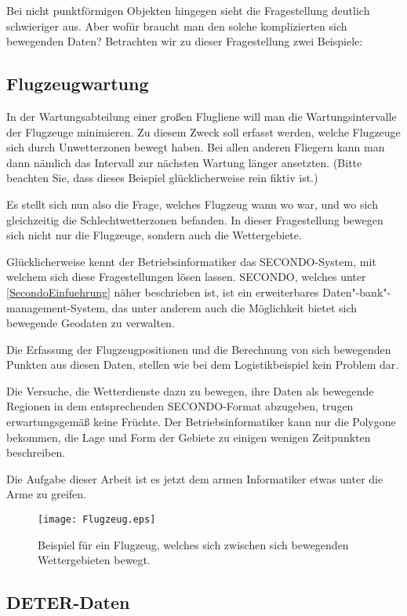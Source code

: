 Bei nicht punktförmigen Objekten hingegen sieht die Fragestellung deutlich schwieriger aus. Aber wofür braucht man den solche komplizierten sich bewegenden Daten? Betrachten wir zu dieser Fragestellung zwei Beispiele:

\subsection*{Flugzeugwartung}

In der Wartungsabteilung einer großen Flugliene will man die Wartungsintervalle der Flugzeuge minimieren. Zu diesem Zweck soll erfasst werden, welche Flugzeuge sich durch Unwetterzonen bewegt haben. Bei allen anderen Fliegern kann man dann nämlich das Intervall zur nächsten Wartung länger ansetzten. (Bitte beachten Sie, dass dieses Beispiel glücklicherweise rein fiktiv ist.)

Es stellt sich nun also die Frage, welches Flugzeug wann wo war, und wo sich gleichzeitig die Schlechtwetterzonen befanden. In dieser Fragestellung bewegen sich nicht nur die Flugzeuge, sondern auch die Wettergebiete.

Glücklicherweise kennt der Betriebsinformatiker das SECONDO-System, mit welchem sich diese Fragestellungen lösen lassen. SECONDO, welches unter \ref{SecondoEinfuehrung} näher beschrieben ist, ist ein erweiterbares Daten"-bank"-management-System, das unter anderem auch die Möglichkeit bietet sich bewegende Geodaten zu verwalten.

Die Erfassung der Flugzeugpositionen und die Berechnung von sich bewegenden Punkten aus diesen Daten, stellen wie bei dem Logistikbeispiel kein Problem dar.

Die Versuche, die Wetterdienste dazu zu bewegen, ihre Daten als bewegende Regionen in dem entsprechenden SECONDO-Format abzugeben, trugen erwartungsgemäß keine Früchte. Der Betriebsinformatiker kann nur die Polygone bekommen, die Lage und Form der Gebiete zu einigen wenigen Zeitpunkten beschreiben.

Die Aufgabe dieser Arbeit ist es jetzt dem armen Informatiker etwas unter die Arme zu greifen.

\begin{figure}
	\centering
	\texttt{[image: Flugzeug.eps]}
	\caption[Flugzeug zwischen Wettergebieten]{Beispiel für ein Flugzeug, welches sich zwischen sich bewegenden Wettergebieten bewegt.}
	\label{fig:Flugzeug}
\end{figure}


\subsection*{DETER-Daten}

